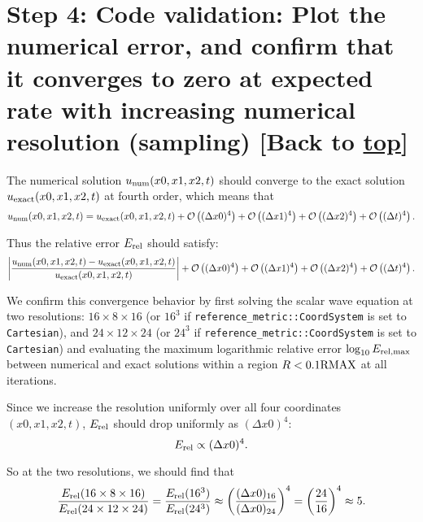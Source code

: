 \documentclass[landscape,letterpaper,10pt,english]{article}
\begin{document}
    \hypertarget{step-4-code-validation-plot-the-numerical-error-and-confirm-that-it-converges-to-zero-at-expected-rate-with-increasing-numerical-resolution-sampling-back-to-top}{%
\section{\texorpdfstring{Step 4: Code validation: Plot the numerical
error, and confirm that it converges to zero at expected rate with
increasing numerical resolution (sampling) {[}Back to
\hyperref[toc]{top}{]}}{Step 4: Code validation: Plot the numerical error, and confirm that it converges to zero at expected rate with increasing numerical resolution (sampling) {[}Back to {]}}}\label{step-4-code-validation-plot-the-numerical-error-and-confirm-that-it-converges-to-zero-at-expected-rate-with-increasing-numerical-resolution-sampling-back-to-top}}

\[\label{convergence}\] The numerical solution
\(u_{\rm num}(x0,x1,x2,t)\) should converge to the exact solution
\(u_{\rm exact}(x0,x1,x2,t)\) at fourth order, which means that \[
u_{\rm num}(x0,x1,x2,t) = u_{\rm exact}(x0,x1,x2,t) + \mathcal{O}\left((\Delta x0)^4\right)+ \mathcal{O}\left((\Delta x1)^4\right)+ \mathcal{O}\left((\Delta x2)^4\right)+ \mathcal{O}\left((\Delta t)^4\right).
\]

Thus the relative error \(E_{\rm rel}\) should satisfy: \[
\left|\frac{u_{\rm num}(x0,x1,x2,t) - u_{\rm exact}(x0,x1,x2,t)}{u_{\rm exact}(x0,x1,x2,t)}\right| + \mathcal{O}\left((\Delta x0)^4\right)+ \mathcal{O}\left((\Delta x1)^4\right)+ \mathcal{O}\left((\Delta x2)^4\right)+ \mathcal{O}\left((\Delta t)^4\right).
\]

We confirm this convergence behavior by first solving the scalar wave
equation at two resolutions: \(16\times 8\times 16\) (or \(16^3\) if
\texttt{reference\_metric::CoordSystem} is set to \texttt{Cartesian}),
and \(24\times 12\times 24\) (or \(24^3\) if
\texttt{reference\_metric::CoordSystem} is set to \texttt{Cartesian})
and evaluating the maximum logarithmic relative error
\(\log_{10} E_{\rm rel,max}\) between numerical and exact solutions
within a region \(R < 0.1 {\rm RMAX}\) at all iterations.

Since we increase the resolution uniformly over all four coordinates
\((x0,x1,x2,t)\), \(E_{\rm rel}\) should drop uniformly as
\((\Delta x0)^4\): \[
E_{\rm rel} \propto (\Delta x0)^4.
\]

So at the two resolutions, we should find that \[
\frac{E_{\rm rel}(16\times 8\times 16)}{E_{\rm rel}(24\times 12\times 24)} = \frac{E_{\rm rel}(16^3)}{E_{\rm rel}(24^3)} \approx \left(\frac{(\Delta x0)_{16}}{(\Delta x0)_{24}}\right)^{4} = \left(\frac{24}{16}\right)^4 \approx 5.
\]
\end{document}
